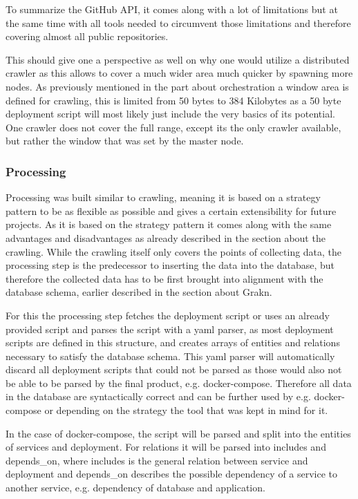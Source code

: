 To summarize the GitHub API, it comes along with a lot of limitations but at the same time with all tools needed to circumvent those limitations and therefore covering almost all public repositories.

This should give one a perspective as well on why one would utilize a distributed crawler as this allows to cover a much wider area much quicker by spawning more nodes. As previously mentioned in the part about orchestration a window area is defined for crawling, this is limited from 50 bytes to 384 Kilobytes as a 50 byte deployment script will most likely just include the very basics of its potential. One crawler does not cover the full range, except its the only crawler available, but rather the window that was set by the master node.

\subsubsection{Processing}
Processing was built similar to crawling, meaning it is based on a strategy pattern to be as flexible as possible and gives a certain extensibility for future projects. As it is based on the strategy pattern it comes along with the same advantages and disadvantages as already described in the section about the crawling.
While the crawling itself only covers the points of collecting data, the processing step is the predecessor to inserting the data into the database, but therefore the collected data has to be first brought into alignment with the database schema, earlier described in the section about Grakn.

For this the processing step fetches the deployment script or uses an already provided script and parses the script with a yaml parser, as most deployment scripts are defined in this structure, and creates arrays of entities and relations necessary to satisfy the database schema. This yaml parser will automatically discard all deployment scripts that could not be parsed as those would also not be able to be parsed by the final product, e.g. docker-compose. Therefore all data in the database are syntactically correct and can be further used by e.g. docker-compose or depending on the strategy the tool that was kept in mind for it.

In the case of docker-compose, the script will be parsed and split into the entities of services and deployment. For relations it will be parsed into includes and depends\_on, where includes is the general relation between service and deployment and depends\_on describes the possible dependency of a service to another service, e.g. dependency of database and application.

